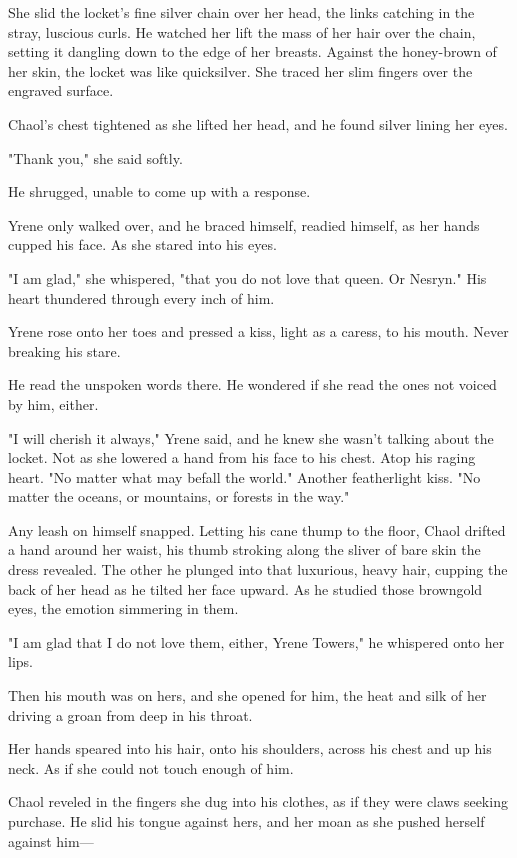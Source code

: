 She slid the locket's fine silver chain over her head, the links catching in the stray, luscious curls. He watched her lift the mass of her hair over the chain, setting it dangling down to the edge of her breasts. Against the honey-brown of her skin, the locket was like quicksilver. She traced her slim fingers over the engraved surface.

Chaol's chest tightened as she lifted her head, and he found silver lining her eyes.

"Thank you," she said softly.

He shrugged, unable to come up with a response.

Yrene only walked over, and he braced himself, readied himself, as her hands cupped his face. As she stared into his eyes.

"I am glad," she whispered, "that you do not love that queen. Or Nesryn." His heart thundered through every inch of him.

Yrene rose onto her toes and pressed a kiss, light as a caress, to his mouth. Never breaking his stare.

He read the unspoken words there. He wondered if she read the ones not voiced by him, either.

"I will cherish it always," Yrene said, and he knew she wasn't talking about the locket. Not as she lowered a hand from his face to his chest. Atop his raging heart. "No matter what may befall the world." Another featherlight kiss. "No matter the oceans, or mountains, or forests in the way."

Any leash on himself snapped. Letting his cane thump to the floor, Chaol drifted a hand around her waist, his thumb stroking along the sliver of bare skin the dress revealed. The other he plunged into that luxurious, heavy hair, cupping the back of her head as he tilted her face upward. As he studied those browngold eyes, the emotion simmering in them.

"I am glad that I do not love them, either, Yrene Towers," he whispered onto her lips.

Then his mouth was on hers, and she opened for him, the heat and silk of her driving a groan from deep in his throat.

Her hands speared into his hair, onto his shoulders, across his chest and up his neck. As if she could not touch enough of him.

Chaol reveled in the fingers she dug into his clothes, as if they were claws seeking purchase. He slid his tongue against hers, and her moan as she pushed herself against him---

